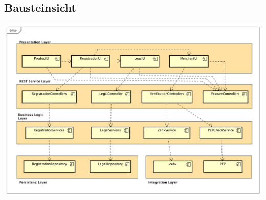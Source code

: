 \graphicspath{{./images/}}

\begin{landscape}
	\thispagestyle{empty}

\chapter{Bausteinsicht}

\begin{center}
	\includegraphics[scale=0.5]{ComponentLevel1.png}
\end{center}

\vfill
\raisebox{0pt}{\makebox[\linewidth][r]{\thepage}}
\end{landscape}
\restoregeometry
